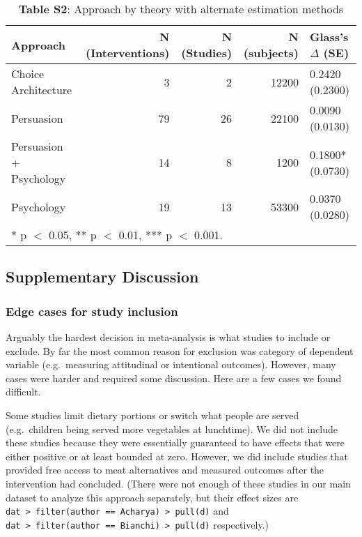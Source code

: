 \documentclass[sn-nature,pdflatex]{sn-jnl}
\begin{document}
\begin{table}[!h]
\centering
\caption{\label{tab:supp_table_two}\textbf{Table S2}: Approach by theory with alternate estimation methods }
\centering
\begin{tabular}[t]{lrrrl}
\toprule
Approach & N (Interventions) & N (Studies) & N (subjects) & Glass's $\Delta$ (SE)\\
\midrule
Choice Architecture & 3 & 2 & 12200 & 0.2420 (0.2300)\\
Persuasion & 79 & 26 & 22100 & 0.0090 (0.0130)\\
Persuasion + Psychology & 14 & 8 & 1200 & 0.1800* (0.0730)\\
Psychology & 19 & 13 & 53300 & 0.0370 (0.0280)\\
\bottomrule
\multicolumn{5}{l}{\rule{0pt}{1em}* p $<$ 0.05, ** p $<$ 0.01, *** p $<$ 0.001.}\\
\end{tabular}
\end{table}

\subsection{Supplementary Discussion}\label{supplementary-discussion}

\subsubsection{Edge cases for study
inclusion}\label{edge-cases-for-study-inclusion}

Arguably the hardest decision in meta-analysis is what studies to
include or exclude. By far the most common reason for exclusion was
category of dependent variable (e.g.~measuring attitudinal or
intentional outcomes). However, many cases were harder and required some
discussion. Here are a few cases we found difficult.

Some studies limit dietary portions or switch what people are served
(e.g.~children being served more vegetables at lunchtime). We did not
include these studies because they were essentially guaranteed to have
effects that were either positive or at least bounded at zero. However,
we did include studies that provided free access to meat alternatives
\citep{acharya2004, bianchi2022} and measured outcomes after the
intervention had concluded. (There were not enough of these studies in
our main dataset to analyze this approach separately, but their effect
sizes are
\texttt{dat\ \textbar{}\textgreater{}\ filter(author\ ==\ \textquotesingle{}Acharya\textquotesingle{})\ \textbar{}\textgreater{}\ pull(d)}
and
\texttt{dat\ \textbar{}\textgreater{}\ filter(author\ ==\ \textquotesingle{}Bianchi\textquotesingle{})\ \textbar{}\textgreater{}\ pull(d)}
respectively.)
\end{document}
